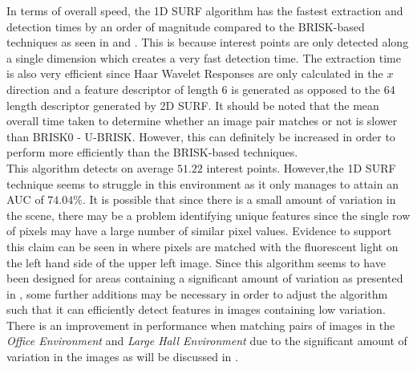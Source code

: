 \documentclass[11pt]{report}
\begin{document}


In terms of overall speed, the 1D SURF algorithm has the fastest extraction and detection times by an order of magnitude compared to the BRISK-based techniques as seen in  and . This is because interest points are only detected along a single dimension which creates a very fast detection time. The extraction time is also very efficient since Haar Wavelet Responses are only calculated in the $x$ direction and a feature descriptor of length $6$ is generated as opposed to the $64$ length descriptor generated by 2D SURF. It should be noted that the mean overall time taken to determine whether an image pair matches or not is slower than BRISK0 - U-BRISK. However, this can definitely be increased in order to perform more efficiently than the BRISK-based techniques.\\

This algorithm detects on average $51.22$ interest points. However,the 1D SURF technique seems to struggle in this environment as it only manages to attain an AUC of $74.04\%$. It is possible that since there is a small amount of variation in the scene, there may be a problem identifying unique features since the single row of pixels may have a large number of similar pixel values. Evidence to support this claim can be seen in  where pixels are matched with the fluorescent light on the left hand side of the upper left image. Since this algorithm seems to have been designed for areas containing a significant amount of variation as presented in \cite{Anderson}, some further additions may be necessary in order to adjust the algorithm such that it can efficiently detect features in images containing low variation. There is an improvement in performance when matching pairs of images in the \textit{Office Environment} and \textit{Large Hall Environment} due to the significant amount of variation in the images as will be discussed in .\\
\end{document}
